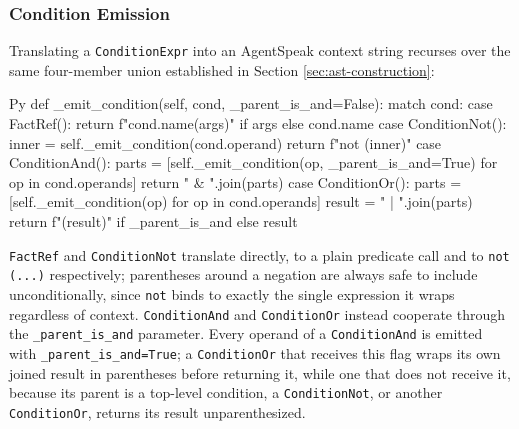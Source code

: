 \subsubsection{Condition Emission}
\label{sec:condition-emission}
Translating a \lstinline|ConditionExpr| into an AgentSpeak context string recurses over the same four-member union established in Section \ref{sec:ast-construction}:
\begin{codeblock}[]{Py}
def _emit_condition(self, cond, _parent_is_and=False):
    match cond:
        case FactRef():
            return f"{cond.name}({args})" if args else cond.name
        case ConditionNot():
            inner = self._emit_condition(cond.operand)
            return f"not ({inner})"
        case ConditionAnd():
            parts = [self._emit_condition(op, _parent_is_and=True) for op in cond.operands]
            return " & ".join(parts)
        case ConditionOr():
            parts = [self._emit_condition(op) for op in cond.operands]
            result = " | ".join(parts)
            return f"({result})" if _parent_is_and else result
\end{codeblock}
\lstinline|FactRef| and \lstinline|ConditionNot| translate directly, to a plain predicate call and to \lstinline|not (...)| respectively; parentheses around a negation are always safe to include unconditionally, since \lstinline|not| binds to exactly the single expression it wraps regardless of context. \lstinline|ConditionAnd| and \lstinline|ConditionOr| instead cooperate through the \lstinline|_parent_is_and| parameter. Every operand of a \lstinline|ConditionAnd| is emitted with \lstinline|_parent_is_and=True|; a \lstinline|ConditionOr| that receives this flag wraps its own joined result in parentheses before returning it, while one that does not receive it, because its parent is a top-level condition, a \lstinline|ConditionNot|, or another \lstinline|ConditionOr|, returns its result unparenthesized.

